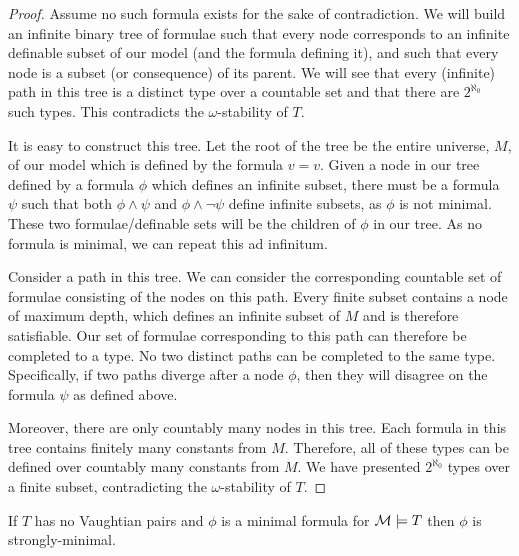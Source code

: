 \begin{proof}\label{proof_minimal_omst}
Assume no such formula exists for the sake of contradiction. 
We will build an infinite binary tree of formulae such that 
every node corresponds to an infinite definable subset of our model (and the formula defining it), 
and such that every node is a subset (or consequence) of its parent. 
We will see that every (infinite) path in this tree is a distinct type over a countable set and that there are \(2^{\aleph_0}\) such types. 
This contradicts the \(\omega\)-stability of \(T\).

It is easy to construct this tree. Let the root of the tree be the entire universe, \(M\), of our model which is defined by the formula \(v = v\).
Given a node in our tree defined by a formula \(\phi\) which defines an infinite subset, there must be a formula \(\psi\) such that both \(\phi \land \psi\) and \(\phi \land \neg \psi\) define infinite subsets, as \(\phi\) is not minimal. 
These two formulae/definable sets will be the children of \(\phi\) in our tree. 
As no formula is minimal, we can repeat this ad infinitum. 

Consider a path in this tree. We can consider the corresponding countable set of formulae consisting of the nodes on this path. 
Every finite subset contains a node of maximum depth, which defines an infinite subset of \(M\) and is therefore satisfiable. 
Our set of formulae corresponding to this path can therefore be completed to a type.
No two distinct paths can be completed to the same type. 
Specifically, if two paths diverge after a node \(\phi\), then they will disagree on the formula \(\psi\) as defined above. 

Moreover, there are only countably many nodes in this tree. 
Each formula in this tree contains finitely many constants from \(M\).
Therefore, all of these types can be defined over countably many constants from \(M\). 
We have presented \(2^{\aleph_0}\) types over a finite subset, contradicting the \(\omega\)-stability of \(T\).
\end{proof}

\begin{lemma}\label{lemma_minimal_vaughtian_pair}
If \(T\) has no Vaughtian pairs and \(\phi\) is a minimal formula for \(\mathcal{M} \models T\) then \(\phi\) is strongly-minimal. 
\end{lemma}

